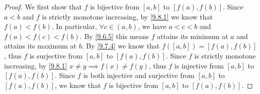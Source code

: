 \begin{proof}
  We first show that \(f\) is bijective from \([a, b]\) to \([f(a), f(b)]\).
  Since \(a < b\) and \(f\) is strictly monotone increasing, by \cref{9.8.1} we know that \(f(a) < f(b)\).
  In particular, \(\forall c \in (a, b)\), we have \(a < c < b\) and \(f(a) < f(c) < f(b)\).
  By \cref{9.6.5} this means \(f\) attains its minimum at \(a\) and attains its maximum at \(b\).
  By \cref{9.7.4} we know that \(f([a, b]) = [f(a), f(b)]\), thus \(f\) is surjective from \([a, b]\) to \([f(a), f(b)]\).
  Since \(f\) is strictly monotone increasing, by \cref{9.8.1} \(x \neq y \implies f(x) \neq f(y)\), thus \(f\) is injective from \([a, b]\) to \([f(a), f(b)]\).
  Since \(f\) is both injective and surjective from \([a, b]\) to \([f(a), f(b)]\), we know that \(f\) is bijective from \([a, b]\) to \([f(a), f(b)]\).


\end{proof}
